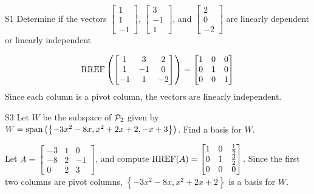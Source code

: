 \documentclass{sbgLAquiz}
\begin{document}
\begin{problem}{S1}
Determine if the vectors $\begin{bmatrix} 1 \\ 1 \\ -1 \end{bmatrix}$, $\begin{bmatrix} 3 \\ -1 \\ 1 \end{bmatrix}$, and $\begin{bmatrix} 2 \\ 0 \\ -2 \end{bmatrix}$ are linearly dependent or linearly independent
\end{problem}
\begin{solution}
$$\RREF\left(\begin{bmatrix} 1 & 3 & 2 \\ 1 & -1 & 0 \\ -1 & 1 & -2 \end{bmatrix} \right)= \begin{bmatrix} 1 & 0 &0 \\ 0 & 1 & 0 \\ 0 & 0 & 1\end{bmatrix}$$
Since each column is a pivot column, the vectors are linearly independent.
\end{solution}


\begin{extract}\newpage\end{extract}
\begin{problem}{S3}
Let $W$ be the subspace of $\P_2$ given by $W = {\rm span} \left( \left\{  -3x^2-8x, x^2+2x+2, -x+3\right\} \right)$.   Find a basis for $W$.
\end{problem}
\begin{solution}
Let $A= \begin{bmatrix}-3 & 1 & 0 \\ -8 & 2 & -1 \\ 0 & 2 & 3\end{bmatrix}$, and compute $\RREF(A) = \begin{bmatrix} 1 & 0 & \frac{1}{2} \\ 0 & 1 & \frac{3}{2} \\ 0 & 0 & 0 \end{bmatrix}$.
Since the first two columns are pivot columns, $\left\{ -3x^2-8x, x^2+2x+2\right\} $ is a basis for $W$.
\end{solution}
\end{document}
